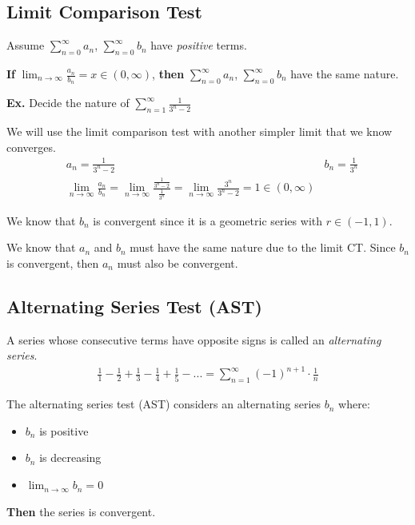 \documentclass[12pt,letterpaper]{article} \usepackage{amsmath} \usepackage{graphicx}  \usepackage{longtable}  \usepackage{amssymb}
\begin{document}
        \subsection{Limit Comparison Test}
        Assume $\sum_{n=0}^{\infty} a_n$, $\sum_{n=0}^{\infty} b_n$ have \emph{positive} terms. 

        \textbf{If} $\lim_{n\to\infty} \frac{a_n}{b_n} = x \in (0,\infty)$, \textbf{then}  $\sum_{n=0}^{\infty} a_n$, $\sum_{n=0}^{\infty} b_n$ have the same nature. 

        \begin{mdframed}
            \textbf{Ex. } Decide the nature of $\sum^{\infty}_{n=1} \frac{1}{3^n -2}$

            We will use the limit comparison test with another simpler limit that we know converges. 
            \begin{align*}
                &a_n = \frac{1}{3^n - 2} &b_n = \frac{1}{3^n}\\
                &\lim_{n\to\infty} \frac{a_n}{b_n} = \lim_{n\to\infty} \frac{\frac{1}{3^n - 2}}{\frac{1}{3^n}} = \lim_{n\to\infty} \frac{3^n}{3^n - 2} = 1 \in (0,\infty)
            \end{align*}

            We know that $b_n$ is convergent since it is a geometric series with $r \in (-1, 1)$.

            We know that $a_n$ and $b_n$ must have the same nature due to the limit CT. Since $b_n$ is convergent, then $a_n$ must also be convergent. 
        \end{mdframed}

        \subsection{Alternating Series Test (AST)}
        A series whose consecutive terms have opposite signs is called an \emph{alternating series}.
        \begin{align*}
            \frac{1}{1} - \frac{1}{2} + \frac{1}{3} - \frac{1}{4} + \frac{1}{5} - ... = \sum^{\infty}_{n=1} (-1)^{n+1} \cdot \frac{1}{n}
        \end{align*}

        The alternating series test (AST) considers an alternating series $b_n$ where:
        \begin{itemize}[noitemsep]
            \item $b_n$ is positive
            \item $b_n$ is decreasing
            \item $\lim_{n\to\infty} b_n = 0$
        \end{itemize}
        \textbf{Then} the series is convergent.
\end{document}
